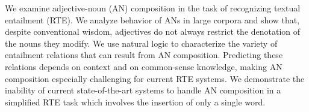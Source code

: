 We examine adjective-noun (AN) composition in the task of recognizing textual entailment (RTE). We analyze behavior of ANs in large corpora and show that, despite conventional wisdom, adjectives do not always restrict the denotation of the nouns they modify. We use natural logic to characterize the variety of entailment relations that can result from AN composition. Predicting these relations depends on context and on common-sense knowledge, making AN composition especially challenging for current RTE systems. We demonstrate the inability of current state-of-the-art systems to handle AN composition in a simplified RTE task which involves the insertion of only a single word.
